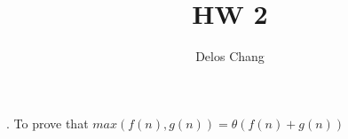 \documentclass[a4paper]{report}
\title{HW 2}
\author{Delos Chang}
\begin{document}
  . To prove that $max(f(n),g(n)) = \theta (f(n) + g(n))$
\end{document}
